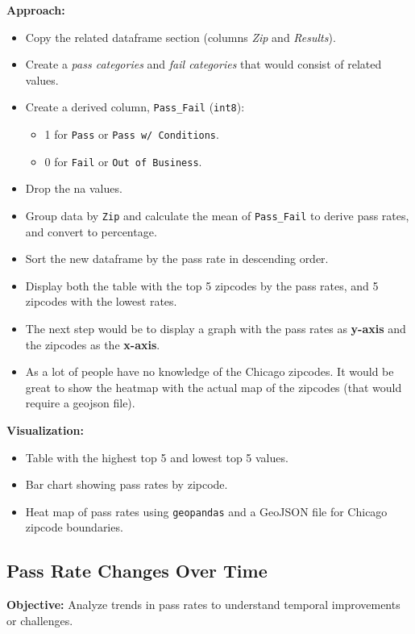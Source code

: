 \documentclass[12pt]{article}
\begin{document}
\textbf{Approach:}
\begin{itemize}
    \item Copy the related dataframe section (columns \textit{Zip} and \textit{Results}).
    \item Create a \textit{pass categories} and \textit{fail categories} that would consist of related values.
    \item Create a derived column, \texttt{Pass\_Fail} (\texttt{int8}):
    \begin{itemize}
        \item 1 for \texttt{Pass} or \texttt{Pass w/ Conditions}.
        \item 0 for \texttt{Fail} or \texttt{Out of Business}.
    \end{itemize}
    \item Drop the na values.
    \item Group data by \texttt{Zip} and calculate the mean of \texttt{Pass\_Fail} to derive pass rates, and convert to percentage.
    \item Sort the new dataframe by the pass rate in descending order.
    \item Display both the table with the top 5 zipcodes by the pass rates, and 5 zipcodes with the lowest rates.
    \item The next step would be to display a graph with the pass rates as \textbf{y-axis} and the zipcodes as the \textbf{x-axis}.
    \item As a lot of people have no knowledge of the Chicago zipcodes.
    It would be great to show the heatmap with the actual map of the zipcodes (that would require a geojson file).
\end{itemize}

\textbf{Visualization:}
\begin{itemize}
    \item Table with the highest top 5 and lowest top 5 values.
    \item Bar chart showing pass rates by zipcode.
    \item Heat map of pass rates using \texttt{geopandas} and a GeoJSON file for Chicago zipcode boundaries.
\end{itemize}

\subsection*{Pass Rate Changes Over Time}
\textbf{Objective:} Analyze trends in pass rates to understand temporal improvements or challenges.
\end{document}
